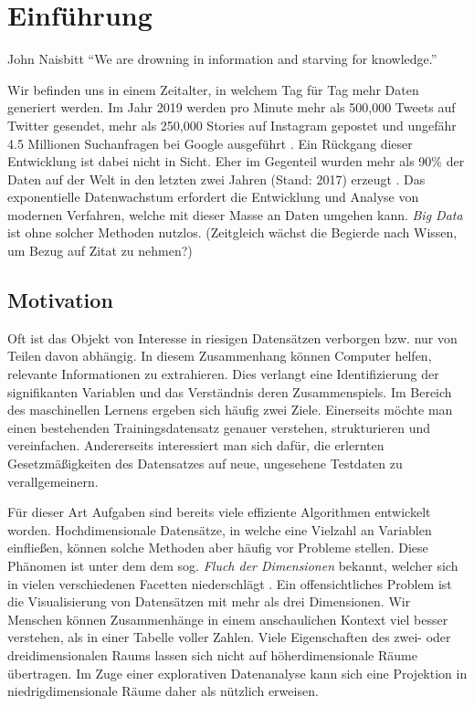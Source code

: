 \chapter{Einführung}

\label{introduction}

\begin{chapquote}{John Naisbitt}
``We are drowning in information and starving for knowledge.''
\end{chapquote}

Wir befinden uns in einem Zeitalter, in welchem Tag für Tag mehr Daten generiert werden. Im Jahr 2019 werden pro Minute mehr als 500,000 Tweets auf Twitter gesendet, mehr als 250,000 Stories auf Instagram gepostet und ungefähr 4.5 Millionen Suchanfragen bei Google ausgeführt \cite{domo}. Ein Rückgang dieser Entwicklung ist dabei nicht in Sicht. Eher im Gegenteil wurden mehr als 90\% der Daten auf der Welt in den letzten zwei Jahren (Stand: 2017) erzeugt \cite{ibm}. Das exponentielle Datenwachstum erfordert die Entwicklung und Analyse von modernen Verfahren, welche mit dieser Masse an Daten umgehen kann. \textit{Big Data} ist ohne solcher Methoden nutzlos. 
(Zeitgleich wächst die Begierde nach Wissen, um Bezug auf Zitat zu nehmen?)
 
 


\section{Motivation}

Oft ist das Objekt von Interesse in riesigen Datensätzen verborgen bzw. nur von Teilen davon abhängig. In diesem Zusammenhang können Computer helfen, relevante Informationen zu extrahieren. Dies verlangt eine Identifizierung der signifikanten Variablen und das Verständnis deren Zusammenspiels. Im Bereich des maschinellen Lernens ergeben sich häufig zwei Ziele. Einerseits möchte man einen bestehenden Trainingsdatensatz genauer verstehen, strukturieren und vereinfachen. Andererseits interessiert man sich dafür, die erlernten Gesetzmäßigkeiten des Datensatzes auf neue, ungesehene Testdaten zu verallgemeinern. 

Für dieser Art Aufgaben sind bereits viele effiziente Algorithmen entwickelt worden. Hochdimensionale Datensätze, in welche eine Vielzahl an Variablen einfließen, können solche Methoden aber häufig vor Probleme stellen. Diese Phänomen ist unter dem dem sog. \textit{Fluch der Dimensionen} bekannt, welcher sich in vielen verschiedenen Facetten niederschlägt \cite{bellman}. Ein offensichtliches Problem ist die Visualisierung von Datensätzen mit mehr als drei Dimensionen. Wir Menschen können Zusammenhänge in einem anschaulichen Kontext viel besser verstehen, als in einer Tabelle voller Zahlen. Viele Eigenschaften des zwei- oder dreidimensionalen Raums lassen sich nicht auf höherdimensionale Räume übertragen. Im Zuge einer explorativen Datenanalyse kann sich eine Projektion in niedrigdimensionale Räume daher als nützlich erweisen.

